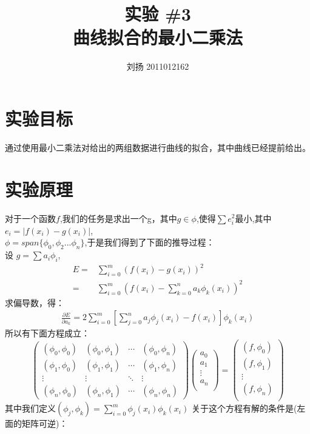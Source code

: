 \documentclass{article}
\title{
\textbf{实验 \#3\\ 
曲线拟合的最小二乘法}
}
\author{刘扬 2011012162}
\date{} %
\begin{document}
\maketitle
\section{实验目标}
通过使用最小二乘法对给出的两组数据进行曲线的拟合，其中曲线已经提前给出。
\section{实验原理}
对于一个函数$f$,我们的任务是求出一个g，其中$g\in\phi$,使得$\sum{e_i^2}$最小,其中$e_i = |f(x_i) - g(x_i)|$,\\$\phi = span\{\phi_0,\phi_2...\phi_n\}$,于是我们得到了下面的推导过程：\\
设
$g = \sum{a_i\phi_i}$,
\begin{align}
E = & \sum_{i=0}^{m}{(f(x_i)-g(x_i))^2} \\
  = & \sum_{i=0}^{m}{(f(x_i)-\sum_{k=0}^{n}{a_k\phi_k(x_i)})^2}
\end{align}
求偏导数，得：
\begin{align}
\frac{\partial{E}}{\partial{a_k}} = 2\sum_{i=0}^{m}[\sum_{j=0}^{n}{a_j\phi_j(x_i)} - f(x_i)]\phi_k({x_i})
\end{align}
所以有下面方程成立：
$$
\left(                 
  \begin{array}{cccc}   
   (\phi_0,\phi_0) & (\phi_0,\phi_1) & \cdots & (\phi_0,\phi_n)\\
   (\phi_1,\phi_0) & (\phi_1,\phi_1) & \cdots & (\phi_1,\phi_n)\\
   \vdots         &\vdots&\ddots&\vdots\\
   (\phi_n,\phi_0) & (\phi_n,\phi_1) & \cdots & (\phi_n,\phi_n)
  \end{array}
\right)                
\left(
\begin{array}{c}
a_0\\
a_1\\
\vdots\\
a_n\\
\end{array}
\right)
=\left(
\begin{array}{c}
(f,\phi_0)\\
(f,\phi_1)\\
\vdots\\
(f,\phi_n)\\
\end{array}
\right)
$$
其中我们定义$(\phi_j,\phi_k) = \sum_{i=0}^{m}\phi_j(x_i)\phi_k(x_i)$
关于这个方程有解的条件是(左面的矩阵可逆)：
\end{document}
